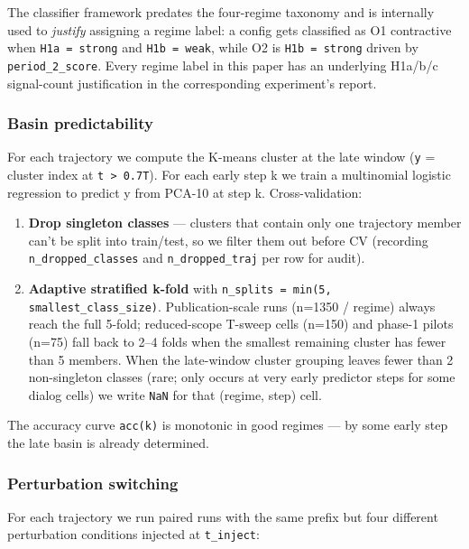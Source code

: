 \documentclass{article}
\theoremstyle{plain}
\theoremstyle{definition}
\begin{document}
The classifier framework predates the four-regime taxonomy and is
internally used to \textit{justify} assigning a regime label: a config gets
classified as O1 contractive when \texttt{H1a = strong} and \texttt{H1b = weak},
while O2 is \texttt{H1b = strong} driven by \texttt{period\_2\_score}. Every regime
label in this paper has an underlying H1a/b/c signal-count justification
in the corresponding experiment's report.

\subsubsection{Basin predictability}

For each trajectory we compute the K-means cluster at the late window
(\texttt{y} = cluster index at \texttt{t > 0.7T}). For each early step k we train a
multinomial logistic regression to predict y from PCA-10 at step k.
Cross-validation:

\begin{enumerate}
  \item \textbf{Drop singleton classes} — clusters that contain only one
   trajectory member can't be split into train/test, so we filter
   them out before CV (recording \texttt{n\_dropped\_classes} and
   \texttt{n\_dropped\_traj} per row for audit).
  \item \textbf{Adaptive stratified k-fold} with
   \texttt{n\_splits = min(5, smallest\_class\_size)}. Publication-scale runs
   (n=1350 / regime) always reach the full 5-fold; reduced-scope
   T-sweep cells (n=150) and phase-1 pilots (n=75) fall back to 2–4
   folds when the smallest remaining cluster has fewer than 5
   members. When the late-window cluster grouping leaves fewer than
   2 non-singleton classes (rare; only occurs at very early
   predictor steps for some dialog cells) we write \texttt{NaN} for that
   (regime, step) cell.
\end{enumerate}

The accuracy curve \texttt{acc(k)} is monotonic in good regimes — by some
early step the late basin is already determined.

\subsubsection{Perturbation switching}

For each trajectory we run paired runs with the same prefix but four
different perturbation conditions injected at \texttt{t\_inject}:
\end{document}
